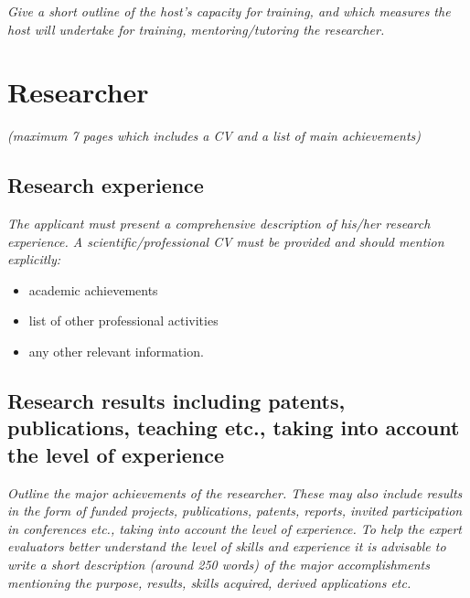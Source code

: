 \documentclass[a4paper,11pt]{article}
\newenvironment{xcomment}{\em}{}
\begin{document}
\begin{xcomment}
 Give a short outline of the host's capacity for training, and which measures the host will
undertake for training, mentoring/tutoring the researcher.
\end{xcomment}


\newpage
\section{Researcher}
\begin{xcomment}  
(maximum 7 pages which includes a CV and a list of main achievements)
\end{xcomment}

\subsection{Research experience}
\begin{xcomment}
  The applicant must present a comprehensive description of his/her research experience. A
  scientific/professional CV must be provided and should mention explicitly:
  \begin{itemize}
    \item academic achievements
    \item list of other professional activities
    \item any other relevant information.
  \end{itemize}
\end{xcomment}

\subsection{Research results including patents, publications, teaching etc., taking into account the level of experience}
\begin{xcomment}
    Outline the major achievements of the researcher. These may also include results in the form of
  funded projects, publications, patents, reports, invited participation in conferences etc., taking into
  account the level of experience. To help the expert evaluators better understand the level of skills
  and experience it is advisable to write a short description (around 250 words) of the major
  accomplishments mentioning the purpose, results, skills acquired, derived applications etc.
\end{xcomment}
\end{document}
